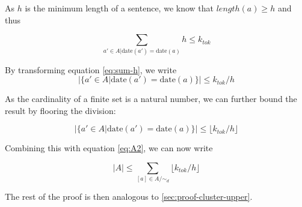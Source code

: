 \documentclass[a4paper,BCOR=10mm]{report}
\numberwithin{lemma}{chapter}
\numberwithin{definition}{chapter}
\begin{document}
\begin{appendices}
As $h$ is the minimum length of a sentence, we know that $\mathit{length}(a) \geq h$ and thus

\begin{equation}
\sum_{ a' \in A | \text{date}(a') = \text{date}(a)} h \leq k_{tok} \label{eq:sum-h}
\end{equation}

By transforming equation \ref{eq:sum-h}, we write
\begin{equation}
|\{ a' \in A | \text{date}(a') = \text{date}(a)\}| \leq k_{tok}/h
\end{equation}

As the cardinality of a finite set is a natural number, we can further bound the result by flooring the division:

\begin{equation}
|\{ a' \in A | \text{date}(a') = \text{date}(a)\}| \leq \lfloor k_{tok}/h \rfloor
\end{equation}


Combining this with equation \ref{eq:A2}, we can now write

\begin{equation}
|A| \leq \sum_{[a] \in A/\sim_d} \lfloor k_{tok}/h \rfloor
\end{equation}

The rest of the proof is then analogous to \ref{sec:proof-cluster-upper}.




\end{appendices}
\end{document}
